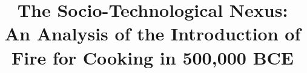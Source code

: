 \title{The Socio-Technological Nexus:\\An Analysis of the Introduction of Fire for Cooking in 500,000 BCE}